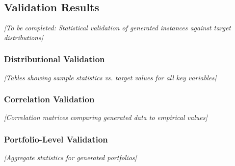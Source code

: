 \subsection{Validation Results}

\textit{[To be completed: Statistical validation of generated instances against target distributions]}

\subsubsection{Distributional Validation}

\textit{[Tables showing sample statistics vs. target values for all key variables]}

\subsubsection{Correlation Validation}

\textit{[Correlation matrices comparing generated data to empirical values]}

\subsubsection{Portfolio-Level Validation}

\textit{[Aggregate statistics for generated portfolios]}
